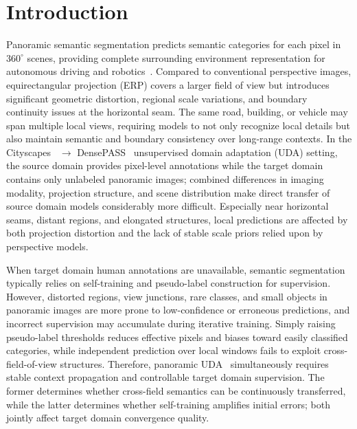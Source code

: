 \section{Introduction}
\label{sec:introduction}

Panoramic semantic segmentation predicts semantic categories for each pixel in $360^\circ$ scenes, providing complete surrounding environment representation for autonomous driving and robotics~\cite{yang2021omnirange,ma2021densepass}. Compared to conventional perspective images, equirectangular projection (ERP) covers a larger field of view but introduces significant geometric distortion, regional scale variations, and boundary continuity issues at the horizontal seam. The same road, building, or vehicle may span multiple local views, requiring models to not only recognize local details but also maintain semantic and boundary consistency over long-range contexts. In the Cityscapes~\cite{cordts2016cityscapes} $\rightarrow$ DensePASS~\cite{ma2021densepass} unsupervised domain adaptation (UDA) setting, the source domain provides pixel-level annotations while the target domain contains only unlabeled panoramic images; combined differences in imaging modality, projection structure, and scene distribution make direct transfer of source domain models considerably more difficult. Especially near horizontal seams, distant regions, and elongated structures, local predictions are affected by both projection distortion and the lack of stable scale priors relied upon by perspective models.

When target domain human annotations are unavailable, semantic segmentation typically relies on self-training and pseudo-label construction for supervision. However, distorted regions, view junctions, rare classes, and small objects in panoramic images are more prone to low-confidence or erroneous predictions, and incorrect supervision may accumulate during iterative training. Simply raising pseudo-label thresholds reduces effective pixels and biases toward easily classified categories, while independent prediction over local windows fails to exploit cross-field-of-view structures. Therefore, panoramic UDA~\cite{zhang2022bending,zheng2023dppass,zheng2023datr,zhang2024goodsam} simultaneously requires stable context propagation and controllable target domain supervision. The former determines whether cross-field semantics can be continuously transferred, while the latter determines whether self-training amplifies initial errors; both jointly affect target domain convergence quality.

